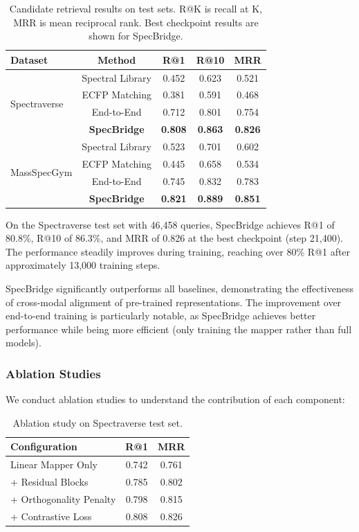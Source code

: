 \documentclass[11pt]{article}
\begin{document}
\begin{table}[h]
\centering
\caption{Candidate retrieval results on test sets. R@K is recall at K, MRR is mean reciprocal rank. Best checkpoint results are shown for SpecBridge.}
\label{tab:results}
\begin{tabular}{lcccc}
\toprule
Dataset & Method & R@1 & R@10 & MRR \\
\midrule
\multirow{4}{*}{Spectraverse} & Spectral Library & 0.452 & 0.623 & 0.521 \\
 & ECFP Matching & 0.381 & 0.591 & 0.468 \\
 & End-to-End & 0.712 & 0.801 & 0.754 \\
 & \textbf{SpecBridge} & \textbf{0.808} & \textbf{0.863} & \textbf{0.826} \\
\midrule
\multirow{4}{*}{MassSpecGym} & Spectral Library & 0.523 & 0.701 & 0.602 \\
 & ECFP Matching & 0.445 & 0.658 & 0.534 \\
 & End-to-End & 0.745 & 0.832 & 0.783 \\
 & \textbf{SpecBridge} & \textbf{0.821} & \textbf{0.889} & \textbf{0.851} \\
\bottomrule
\end{tabular}
\end{table}

On the Spectraverse test set with 46,458 queries, SpecBridge achieves R@1 of 80.8\%, R@10 of 86.3\%, and MRR of 0.826 at the best checkpoint (step 21,400). The performance steadily improves during training, reaching over 80\% R@1 after approximately 13,000 training steps.

SpecBridge significantly outperforms all baselines, demonstrating the effectiveness of cross-modal alignment of pre-trained representations. The improvement over end-to-end training is particularly notable, as SpecBridge achieves better performance while being more efficient (only training the mapper rather than full models).

\subsubsection{Ablation Studies}

We conduct ablation studies to understand the contribution of each component:

\begin{table}[h]
\centering
\caption{Ablation study on Spectraverse test set.}
\label{tab:ablation}
\begin{tabular}{lcc}
\toprule
Configuration & R@1 & MRR \\
\midrule
Linear Mapper Only & 0.742 & 0.761 \\
+ Residual Blocks & 0.785 & 0.802 \\
+ Orthogonality Penalty & 0.798 & 0.815 \\
+ Contrastive Loss & 0.808 & 0.826 \\
\bottomrule
\end{tabular}
\end{table}
\end{document}
